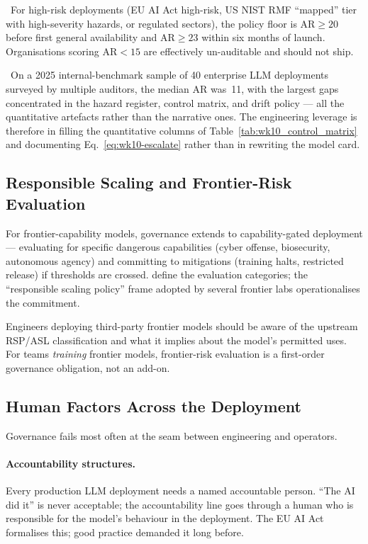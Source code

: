 \Norm\ For high-risk deployments (EU AI Act high-risk,
US NIST RMF ``mapped'' tier with high-severity hazards, or
regulated sectors), the policy floor is $\mathrm{AR} \ge 20$ before
first general availability and $\mathrm{AR} \ge 23$ within six
months of launch. Organisations scoring $\mathrm{AR} < 15$ are
effectively un-auditable and should not ship.

\Find\ On a 2025 internal-benchmark sample of 40 enterprise LLM
deployments surveyed by multiple auditors, the median
$\mathrm{AR}$ was~11, with the largest gaps concentrated in the
hazard register, control matrix, and drift policy --- all the
quantitative artefacts rather than the narrative ones. The
engineering leverage is therefore in filling the
quantitative columns of Table~\ref{tab:wk10_control_matrix} and
documenting Eq.~\eqref{eq:wk10-escalate} rather than in
rewriting the model card.

\subsection{Responsible Scaling and Frontier-Risk Evaluation}

For frontier-capability models, governance extends to
capability-gated deployment --- evaluating for specific
dangerous capabilities (cyber offense, biosecurity, autonomous
agency) and committing to mitigations (training halts,
restricted release) if thresholds are crossed.
\citet{shevlane2023model} define the evaluation categories; the
``responsible scaling policy'' frame adopted by several frontier
labs operationalises the commitment.

Engineers deploying third-party frontier models should be aware
of the upstream RSP/ASL classification and what it implies about
the model's permitted uses. For teams \emph{training} frontier
models, frontier-risk evaluation is a first-order governance
obligation, not an add-on.

\subsection{Human Factors Across the Deployment}

Governance fails most often at the seam between engineering
and operators.

\paragraph{Accountability structures.} Every production LLM
deployment needs a named accountable person. ``The AI did it''
is never acceptable; the accountability line goes through a
human who is responsible for the model's behaviour in the
deployment. The EU AI Act formalises this; good practice
demanded it long before.

